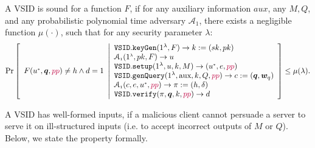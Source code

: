 \begin{definition}\label{deff::VSID-Soundness}  A VSID  is sound for a function $F$, if for any auxiliary information $aux$, any $M,Q$, and any probabilistic polynomial time adversary $\mathcal{A}_{\scriptscriptstyle 1}$, there exists a negligible function $\mu(\cdot)$, such that for any security parameter $\lambda$: 
\small{
$$ \Pr\left[
  \begin{array}{l}
F(u^{\scriptscriptstyle *}, \bm{q},{\color{purple}pp})\neq h \wedge d=1
\end{array} \middle |
    \begin{array}{l}
    \mathtt{VSID.keyGen}(1^{\lambda},F)\rightarrow k:=(sk,pk)\\
    \mathcal{A}_{\scriptscriptstyle 1}(1^{\scriptscriptstyle\lambda},pk, F)\rightarrow u\\
    \mathtt{VSID.setup}(1^{\lambda}, u, k, M)\rightarrow (u^{\scriptscriptstyle *},e,{\color{purple}pp})\\
    \mathtt{VSID.genQuery}(1^{\lambda},  \text{aux},k,Q,{\color{purple}pp})\rightarrow c:=(\bm{q}, \bm{w}_{q})\\
     \mathcal{A}_{\scriptscriptstyle 1}(c,e, u^{\scriptscriptstyle *},{\color{purple}pp})\rightarrow \pi:=(h,\delta)\\
     \mathtt{VSID.verify}(\pi,\bm{q},k,{\color{purple}pp})\rightarrow d\\
\end{array}    \right]\leq \mu(\lambda).$$
}
\end{definition}


A VSID has   well-formed inputs, if a malicious client cannot persuade a server to serve it on  ill-structured inputs (i.e. to accept  incorrect outputs of $M$ or $Q$). Below, we state the property formally.

